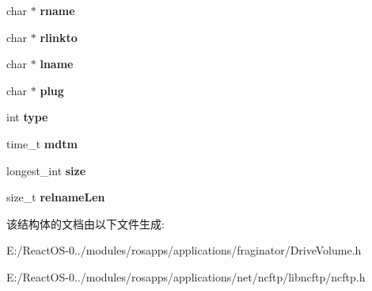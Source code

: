 \begin{DoxyCompactItemize}
\mbox{\label{struct_file_info_adebea21bf7eba0cc8e93c3b4a559c571}} 
char $\ast$ {\bfseries rname}
\item 
\mbox{\label{struct_file_info_a60e3eb79387720401ed7f1b5df232d7f}} 
char $\ast$ {\bfseries rlinkto}
\item 
\mbox{\label{struct_file_info_a604dfe9254c93688db16a1b546a19415}} 
char $\ast$ {\bfseries lname}
\item 
\mbox{\label{struct_file_info_aa5de16ce4341c1f272fab109490c9dcc}} 
char $\ast$ {\bfseries plug}
\item 
\mbox{\label{struct_file_info_a5d0ed1ad62d1f5a798eb13a41c4f1b73}} 
int {\bfseries type}
\item 
\mbox{\label{struct_file_info_a8be84e0f3333fde6ddda394680ac7cce}} 
time\+\_\+t {\bfseries mdtm}
\item 
\mbox{\label{struct_file_info_a0b3c53a1139534de2b3f963c89ec4f1e}} 
longest\+\_\+int {\bfseries size}
\item 
\mbox{\label{struct_file_info_a3419934a13d545c6f144e2b7df3a922b}} 
size\+\_\+t {\bfseries relname\+Len}
\end{DoxyCompactItemize}


该结构体的文档由以下文件生成\+:\begin{DoxyCompactItemize}
\item 
E\+:/\+React\+O\+S-\/0../modules/rosapps/applications/fraginator/Drive\+Volume.\+h\item 
E\+:/\+React\+O\+S-\/0../modules/rosapps/applications/net/ncftp/libncftp/ncftp.\+h\end{DoxyCompactItemize}
